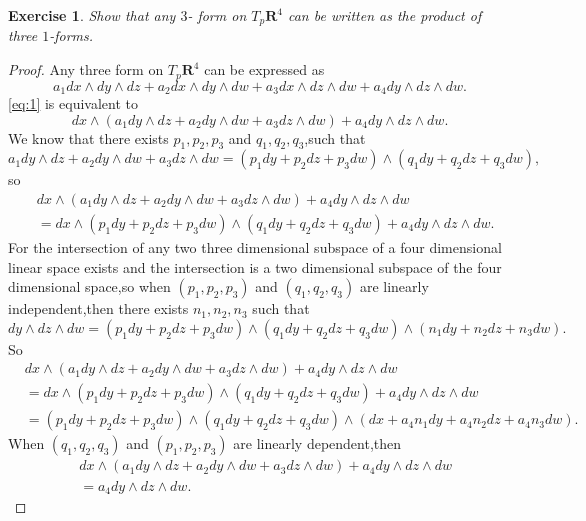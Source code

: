 \documentclass[a4paper]{article}
\newtheorem*{exe}{Exercise}
\newenvironment{exercise}
{\bigskip\begin{mdframed}\begin{exe}}
    {\end{exe}\end{mdframed}\bigskip}
\begin{document}
\begin{exercise}
  Show that any $3$- form on $T_p\mathbf{R}^4$ can be written as the
  product of three $1$-forms.
\end{exercise}
\begin{proof}
Any three form on $T_p\mathbf{R}^4$ can be expressed as
\begin{equation}\label{eq:1}
a_1dx\wedge dy\wedge dz+a_2dx\wedge dy\wedge dw+a_3dx\wedge dz\wedge
dw+a_4dy\wedge dz\wedge dw.
\end{equation}
\eqref{eq:1} is equivalent to
\begin{equation}
  \label{eq:2}
dx\wedge (a_1dy\wedge dz+a_2dy\wedge dw+a_3dz\wedge dw)+a_4dy\wedge
dz\wedge dw.
\end{equation}
We know that there exists $p_1,p_2,p_3$ and $q_1,q_2,q_3$,such that 
$$
a_1dy\wedge dz+a_2dy\wedge dw+a_3dz\wedge dw=(p_1dy+p_2dz+p_3dw)\wedge (q_1dy+q_2dz+q_3dw),
$$
so
\begin{align*}
&dx\wedge (a_1dy\wedge dz+a_2dy\wedge dw+a_3dz\wedge dw)+a_4dy\wedge
dz\wedge dw\\&=dx\wedge (p_1dy+p_2dz+p_3dw)\wedge
(q_1dy+q_2dz+q_3dw)+a_4dy\wedge dz\wedge dw.
\end{align*}
For the intersection of any two three dimensional subspace of a four dimensional linear
space exists and the intersection  is a two dimensional subspace of
the four dimensional space,so when $(p_1,p_2,p_3)$ and $(q_1,q_2,q_3)$
are linearly independent,then there exists $n_1,n_2,n_3$ such that 
$$
dy\wedge dz\wedge dw=(p_1dy+p_2dz+p_3dw)\wedge
(q_1dy+q_2dz+q_3dw)\wedge (n_1dy+n_2dz+n_3dw).
$$
So
\begin{align*}
&dx\wedge (a_1dy\wedge dz+a_2dy\wedge dw+a_3dz\wedge dw)+a_4dy\wedge
dz\wedge dw\\&=dx\wedge (p_1dy+p_2dz+p_3dw)\wedge
(q_1dy+q_2dz+q_3dw)+a_4dy\wedge dz\wedge dw
\\&=(p_1dy+p_2dz+p_3dw)\wedge
(q_1dy+q_2dz+q_3dw)\wedge (dx+a_4n_1dy+a_4n_2dz+a_4n_3dw).
\end{align*}
When $(q_1,q_2,q_3)$ and $(p_1,p_2,p_3)$ are linearly dependent,then 
\begin{align*}
&dx\wedge (a_1dy\wedge dz+a_2dy\wedge dw+a_3dz\wedge dw)+a_4dy\wedge
dz\wedge dw\\&=a_4dy\wedge dz\wedge dw.
\end{align*}
\end{proof}
\end{document}
